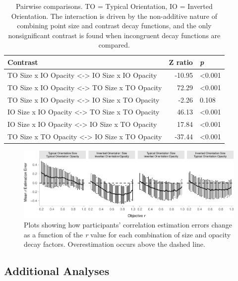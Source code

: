 \documentclass[sigconf]{acmart}
\begin{document}
\hypertarget{tbl-contrasts}{}
\begin{table}
\caption{\label{tbl-contrasts}Pairwise comparisons. TO = Typical Orientation, IO = Inverted
Orientation. The interaction is driven by the non-additive nature of
combining point size and contrast decay functions, and the only
nonsignificant contrast is found when incongruent decay functions are
compared. }\tabularnewline

\centering
\begin{tabular}[t]{lrl}
\toprule
Contrast & Z ratio & \textit{p}\\
\midrule
TO Size x IO Opacity <-> IO Size x IO Opacity & -10.95 & <0.001\\
TO Size x IO Opacity <-> TO Size x TO Opacity & 72.29 & <0.001\\
TO Size x IO Opacity <-> IO Size x TO Opacity & -2.26 & 0.108\\
IO Size x IO Opacity <-> TO Size x TO Opacity & 46.13 & <0.001\\
IO Size x IO Opacity <-> IO Size x TO Opacity & 17.84 & <0.001\\
\addlinespace
TO Size x TO Opacity <-> IO Size x TO Opacity & -37.44 & <0.001\\
\bottomrule
\end{tabular}
\end{table}

\begin{figure}

{\centering \includegraphics[width=1\textwidth,height=\textheight]{size_and_opacity_files/figure-pdf/fig-diff-error-bars-plot-1.pdf}

}

\caption{\label{fig-diff-error-bars-plot}Plots showing how participants'
correlation estimation errors change as a function of the \emph{r} value
for each combination of size and opacity decay factors. Overestimation
occurs above the dashed line.}

\end{figure}

\hypertarget{sec-add-analyses}{%
\subsection{Additional Analyses}\label{sec-add-analyses}}
\end{document}
